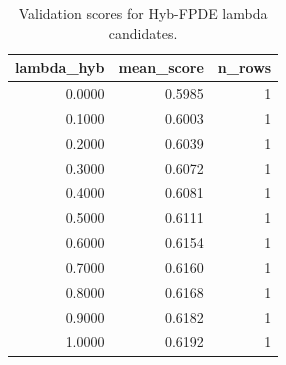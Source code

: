 \begin{table}[t]
\caption{Validation scores for Hyb-FPDE lambda candidates.}
\label{tab:lambda_distribution_computed}
\centering
\begin{tabular}{rrr}
\toprule
lambda\_hyb & mean\_score & n\_rows \\
\midrule
0.0000 & 0.5985 & 1 \\
0.1000 & 0.6003 & 1 \\
0.2000 & 0.6039 & 1 \\
0.3000 & 0.6072 & 1 \\
0.4000 & 0.6081 & 1 \\
0.5000 & 0.6111 & 1 \\
0.6000 & 0.6154 & 1 \\
0.7000 & 0.6160 & 1 \\
0.8000 & 0.6168 & 1 \\
0.9000 & 0.6182 & 1 \\
1.0000 & 0.6192 & 1 \\
\bottomrule
\end{tabular}

\end{table}
